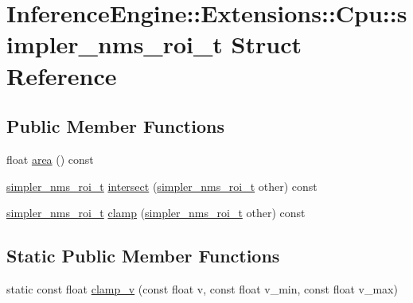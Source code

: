 \hypertarget{structInferenceEngine_1_1Extensions_1_1Cpu_1_1simpler__nms__roi__t}{}\section{Inference\+Engine\+:\+:Extensions\+:\+:Cpu\+:\+:simpler\+\_\+nms\+\_\+roi\+\_\+t Struct Reference}
\label{structInferenceEngine_1_1Extensions_1_1Cpu_1_1simpler__nms__roi__t}
\subsection*{Public Member Functions}
\begin{DoxyCompactItemize}
\item 
float \hyperlink{structInferenceEngine_1_1Extensions_1_1Cpu_1_1simpler__nms__roi__t_adeea7edb1b4ff1095070e499559e1af8}{area} () const 
\item 
\hyperlink{structInferenceEngine_1_1Extensions_1_1Cpu_1_1simpler__nms__roi__t}{simpler\+\_\+nms\+\_\+roi\+\_\+t} \hyperlink{structInferenceEngine_1_1Extensions_1_1Cpu_1_1simpler__nms__roi__t_ae66a1fe3d522b527cd913d6bc9fed41c}{intersect} (\hyperlink{structInferenceEngine_1_1Extensions_1_1Cpu_1_1simpler__nms__roi__t}{simpler\+\_\+nms\+\_\+roi\+\_\+t} other) const 
\item 
\hyperlink{structInferenceEngine_1_1Extensions_1_1Cpu_1_1simpler__nms__roi__t}{simpler\+\_\+nms\+\_\+roi\+\_\+t} \hyperlink{structInferenceEngine_1_1Extensions_1_1Cpu_1_1simpler__nms__roi__t_afa04c9d227fd4a9f8e7877269c0f6f42}{clamp} (\hyperlink{structInferenceEngine_1_1Extensions_1_1Cpu_1_1simpler__nms__roi__t}{simpler\+\_\+nms\+\_\+roi\+\_\+t} other) const 
\end{DoxyCompactItemize}
\subsection*{Static Public Member Functions}
\begin{DoxyCompactItemize}
\item 
static const float \hyperlink{structInferenceEngine_1_1Extensions_1_1Cpu_1_1simpler__nms__roi__t_a212de1b1ec4b270d3006e8b5b6838294}{clamp\+\_\+v} (const float v, const float v\+\_\+min, const float v\+\_\+max)
\end{DoxyCompactItemize}
